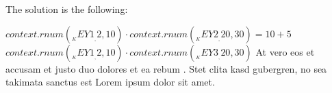 The solution is the following:
\begin{Solution}
\solitem ${{context.rnum(__KEY1__, 2, 10)}} \cdot {{context.rnum(__KEY2__, 20, 30)}} = {{10+5}}$
\solitem ${{context.rnum(__KEY1__, 2, 10)}} \cdot {{context.rnum(__KEY3__, 20, 30)}}$ 
\solitem At vero eos et accusam et justo duo dolores et ea rebum . Stet clita kasd gubergren, no sea takimata sanctus est Lorem ipsum dolor sit amet. 
\end{Solution}